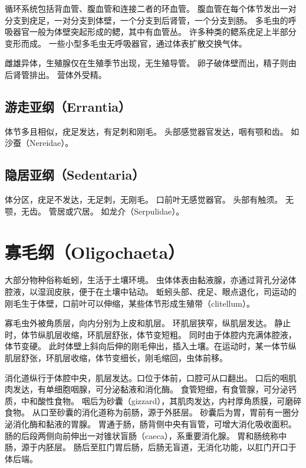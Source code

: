 \documentclass[11pt]{article}
\begin{document}
\newline

循环系统包括背血管、腹血管和连接二者的环血管。
腹血管在每个体节发出一对分支到疣足，一对分支到体壁，一个分支到后肾管，一个分支到肠。
多毛虫的呼吸器官一般为体壁突起形成的鳃，其中有血管丛。
许多种类的鳃系疣足上半部分变形而成。
一些小型多毛虫无呼吸器官，通过体表扩散交换气体。

\newline

雌雄异体，生殖腺仅在生殖季节出现，无生殖导管。
卵子破体壁而出，精子则由后肾管排出。
营体外受精。

\subsection{游走亚纲（Errantia）}
体节多且相似，疣足发达，有足刺和刚毛。
头部感觉器官发达，咽有颚和齿。
如沙蚕（Nereidae）。

\subsection{隐居亚纲（Sedentaria）}
体分区，疣足不发达，无足刺，无刚毛。
口前叶无感觉器官。
头部有触须。
无颚，无齿。
管居或穴居。
如龙介（Serpulidae）。

\section{寡毛纲（Oligochaeta）}
大部分物种俗称蚯蚓，生活于土壤环境。
虫体体表由黏液腺，亦通过背孔分泌体腔液，以湿润皮肤，便于在土壤中钻动。
蚯蚓头部、疣足、眼点退化，司运动的刚毛生于体壁，口前叶可以伸缩，某些体节形成生殖带（clitellum）。

\newline

寡毛虫外被角质层，向内分别为上皮和肌层。
环肌层狭窄，纵肌层发达。
静止时，体节纵肌层收缩，环肌层舒张，体节变短粗。
同时由于体腔内充满体腔液，体节变硬。
此时体壁上斜向后伸的刚毛伸出，插入土壤。在运动时，某一体节纵肌层舒张，环肌层收缩，体节变细长，刚毛缩回，虫体前移。

\newline

消化道纵行于体腔中央，肌层发达。口位于体前，口腔可从口翻出。
口后的咽肌肉发达，有单细胞咽腺，可分泌黏液和消化酶。
食管短细，有食管腺，可分泌钙质，中和酸性食物。
咽后为砂囊（gizzard），其肌肉发达，内衬厚角质膜，可磨碎食物。
从口至砂囊的消化道称为前肠，源于外胚层。
砂囊后为胃，胃前有一圈分泌消化酶和黏液的胃腺。
胃通于肠，肠背侧中央有盲管，可增大消化吸收面积。
肠的后段两侧向前伸出一对锥状盲肠（caeca），系重要消化腺。
胃和肠统称中肠，源于内胚层。
肠后至肛门胃后肠，后肠无盲道，无消化功能，以肛门开口于体后端。
\end{document}
